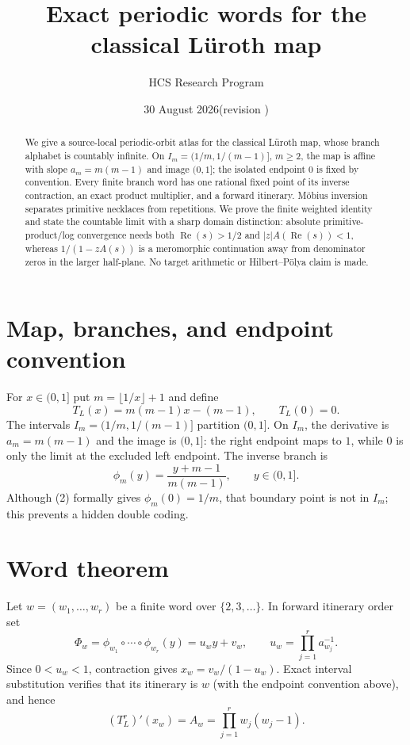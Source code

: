 \documentclass[10pt]{article}
\title{Exact periodic words for the classical L\"uroth map}
\author{HCS Research Program}
\date{30 August 2026\quad (revision \CRevisionRound)}
\begin{document}
\maketitle

\begin{abstract}
We give a source-local periodic-orbit atlas for the classical L\"uroth map,
whose branch alphabet is countably infinite.  On
$I_m=(1/m,1/(m-1)]$, $m\ge2$, the map is affine with slope
$a_m=m(m-1)$ and image $(0,1]$; the isolated endpoint $0$ is fixed by
convention.  Every finite branch word has one rational fixed point of its
inverse contraction, an exact product multiplier, and a forward itinerary.
M\"obius inversion separates primitive necklaces from repetitions.  We prove
the finite weighted identity and state the countable limit with a sharp domain
distinction: absolute primitive-product/log convergence needs both
$\operatorname{Re}(s)>1/2$ and $|z|A(\operatorname{Re}(s))<1$, whereas
$1/(1-zA(s))$ is a meromorphic continuation away from denominator zeros in
the larger half-plane.  No target arithmetic or Hilbert--P\"olya claim is made.
\end{abstract}

\section{Map, branches, and endpoint convention}
For $x\in(0,1]$ put $m=\lfloor1/x\rfloor+1$ and define
\begin{equation}
 T_L(x)=m(m-1)x-(m-1),\qquad T_L(0)=0.                         \tag{1}
\end{equation}
The intervals $I_m=(1/m,1/(m-1)]$ partition $(0,1]$.  On $I_m$, the
derivative is $a_m=m(m-1)$ and the image is $(0,1]$: the right endpoint maps
to $1$, while $0$ is only the limit at the excluded left endpoint.  The inverse
branch is
\begin{equation}
 \phi_m(y)=\frac{y+m-1}{m(m-1)},\qquad y\in(0,1].                  \tag{2}
\end{equation}
Although (2) formally gives $\phi_m(0)=1/m$, that boundary point is not in
$I_m$; this prevents a hidden double coding.

\section{Word theorem}
Let $w=(w_1,\ldots,w_r)$ be a finite word over $\{2,3,\ldots\}$.  In forward
itinerary order set
\begin{equation}
 \Phi_w=\phi_{w_1}\circ\cdots\circ\phi_{w_r}(y)=u_wy+v_w,\qquad
 u_w=\prod_{j=1}^r a_{w_j}^{-1}.                                  \tag{3}
\end{equation}
Since $0<u_w<1$, contraction gives $x_w=v_w/(1-u_w)$.  Exact interval
substitution verifies that its itinerary is $w$ (with the endpoint convention
above), and hence
\begin{equation}
 (T_L^r)'(x_w)=A_w=\prod_{j=1}^r w_j(w_j-1).                       \tag{4}
\end{equation}
\end{document}
